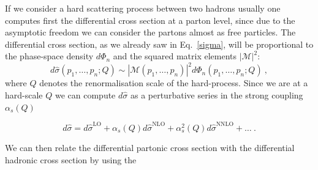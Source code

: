 \documentclass[../main/main.tex]{subfiles}
\begin{document}
If we consider a hard scattering  process between two hadrons usually one computes first the differential cross section at a parton level, since due to the asymptotic freedom we can consider the partons almost as free particles.
The differential cross section, as we already saw in Eq.~\ref{sigma}, will be proportional to the phase-space density $d\Phi_n$ and the squared
matrix elements $|\mathcal{M}|^2$:
\begin{equation}
	\label{partonic cross section}
	d\hat{\sigma}(p_1,\dots, p_n; Q) \sim |\mathcal{M}(p_1,\dots, p_n)|^2 d\Phi_n(p_1,\dots, p_n; Q)  \ ,
\end{equation}
where $Q$ denotes the renormalisation scale of the hard-process. Since we are at a hard-scale $Q$ we can compute $d\hat{\sigma}$ as a 
perturbative series in the strong coupling  $\alpha_s(Q)$

\begin{equation}
	d\hat{\sigma} = d\hat{\sigma}^{\text{LO}} + \alpha_s(Q)  d\hat{\sigma}^{\text{NLO}} + \alpha^2_s(Q)  d\hat{\sigma}^{\text{NNLO}} + \dots
	\ .
\end{equation}

We can then relate the differential partonic cross section with the differential hadronic cross section by using the 
\end{document}
